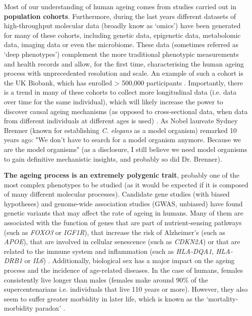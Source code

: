 \bigskip

Most of our understanding of human ageing comes from studies carried out in \textbf{population cohorts}. Furthermore, during the last years different datasets of high-throughput molecular data (broadly know as `omics') have been generated for many of these cohorts, including genetic data, epigenetic data, metabolomic data, imaging data or even the microbiome. These data (sometimes referred as `deep phenotypes') complement the more traditional phenotypic measurements and health records and allow, for the first time, characterising the human ageing process with unprecedented resolution and scale. An example of such a cohort is the UK Biobank, which has enrolled > 500,000 participants \cite{Bahcall2018}. Importantly, there is a trend in many of these cohorts to collect more longitudinal data (i.e. data over time for the same individual), which will likely increase the power to discover causal ageing mechanisms (as opposed to cross-sectional data, when data from different individuals at different ages is used) \cite{Rahmadi2017}. As Nobel laureate Sydney Brenner (known for establishing \textit{C. elegans} as a model organism) remarked 10 years ago: "We don't have to search for a model organism anymore. Because we are the model organisms" \cite{FitzGerald2018} (as a disclosure, I still believe we need model organisms to gain definitive mechanistic insights, and probably so did Dr. Brenner). 

\bigskip

\textbf{The ageing process is an extremely polygenic trait}, probably one of the most complex phenotypes to be studied (as it would be expected if it is composed of many different molecular processes). Candidate gene studies (with biased hypotheses) and genome-wide association studies (\acrshort{GWAS}, unbiased) have found genetic variants that may affect the rate of ageing in humans. Many of them are associated with the function of genes that are part of nutrient-sensing pathways (such as \textit{FOXO3} or \textit{IGF1R}), that increase the risk of Alzheimer's (such as \textit{APOE}), that are involved in cellular senescence (such as \textit{CDKN2A}) or that are related to the immune system and inflammation (such as \textit{HLA-DQA1}, \textit{HLA-DRB1} or \textit{IL6}) \cite{Singh2019,Partridge2018}. Additionally, biological sex has a major impact on the ageing process and the incidence of age-related diseases. In the case of humans, females consistently live longer than males (females make around 90\% of the supercentenarians i.e. individuals that live 110 years or more). However, they also seem to suffer greater morbidity in later life, which is known as the `mortality-morbidity paradox' \cite{Austad2016}.

